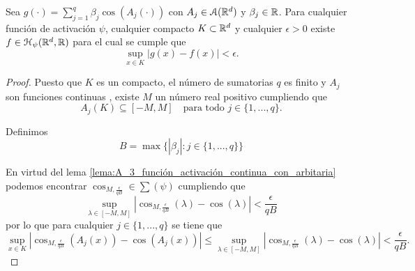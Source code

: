 \begin{lema}\label{lema:A_4_sum_cos_aproxima}
    Sea $g(\cdot) = \sum_{j=1}^q \beta_j \cos(A_j(\cdot))$ con 
    $A_j \in \mathcal{A}(\mathbb{R}^d)$ y $\beta_j \in \mathbb{R}$.
    Para cualquier función de activación $\psi$, 
    cualquier compacto $K \subset \mathbb{R}^d$
    y cualquier $\epsilon > 0$
    existe $f \in \mathcal{H}_\psi{(\mathbb{R}^d, \mathbb{R})}$ para el cual se cumple que 
    \begin{equation}
        \sup_{x \in K} 
        |g(x) - f(x)| < \epsilon.
    \end{equation}
\end{lema}
\begin{proof}
    Puesto que $K$ es un compacto, el número de sumatorias $q$
    es finito y $A_j$ son funciones continuas
    , existe
     $M$ un número real positivo  cumpliendo que
    \begin{equation}
        A_j(K) \subseteq [-M, M] 
        \quad 
        \text{para todo } j \in \{1, ..., q \}. 
    \end{equation} 

    Definimos  
    \begin{equation}
        B = \max \{ |\beta_j| :  j \in \{1, ..., q \}\}
    \end{equation}

    En virtud del lema \ref{lema:A_3_función_activación_continua_con_arbitaria}
    podemos encontrar
    $\cos_{M, \frac{\epsilon}{q B}} \in \sum(\psi)$ cumpliendo que
    \begin{equation}
        \sup_{\lambda \in [-M, M]} | 
        \cos_{M, \frac{\epsilon}{q B}}(\lambda)
        - 
        \cos(\lambda)
        | 
        < \frac{\epsilon}{q B} 
    \end{equation}
    por lo que para cualquier  $j \in \{1, ..., q \}$   se tiene que 
    \begin{equation}
        \sup_{x \in K} | 
        \cos_{M, \frac{\epsilon}{q B}}(A_j(x))
        - 
        \cos(A_j(x))
        | 
        \leq  
        \sup_{\lambda \in [-M, M]} | 
        \cos_{M, \frac{\epsilon}{q B}}(\lambda)
        - 
        \cos(\lambda)
        | 
        < \frac{\epsilon}{q B}. 
    \end{equation}


\end{proof}
